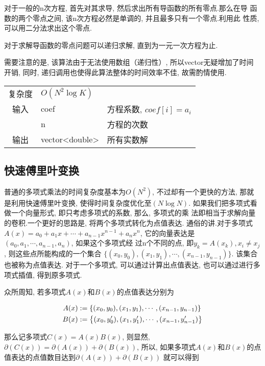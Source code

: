 对于一般的n次方程, 首先对其求导, 然后求出所有导函数的所有零点.那么在导
函数的两个零点之间, 该n次方程必然是单调的, 并且最多只有一个零点.利用此
性质, 可以用二分法求出这个零点.

对于求解导函数的零点问题可以递归求解, 直到为一元一次方程为止.

需要注意的是, 该算法由于无法使用数组（递归性）, 所以vector无疑增加了时间
开销, 同时, 递归调用也使得此算法整体的时间效率不佳, 故需酌情使用.

\begin{longtable}{|c|l|l|}
复杂度 & $O(N^{2}\log K)$ &  \\
输入 & coef & 方程系数, $coef[i] = a_{i}$ \\
 & n & 方程的次数 \\
输出 & vector<double> & 所有实数解 \\ 
\end{longtable}



    \subsection{快速傅里叶变换}\small
普通的多项式乘法的时间复杂度基本为$O(N^2)$, 不过却有一个更快的方法, 那就
是利用快速傅里叶变换, 使得时间复杂度优化至$(N\log N)$.
如果我们把多项式看做一个向量形式, 即只考虑多项式的系数, 那么, 多项式的乘
法即相当于求解向量的卷积.一个更好的思路是, 将两个多项式转化为点值表达.
通俗的讲.对于多项式
$A(x) = a_{0} + a_{1}x + \cdots + a_{n-1}x^{n-1} + a_{n}x^{n}$,
它的向量表达是$(a_{0},  a_{1}, \cdots , a_{n-1}, a_{n})$, 如果这个多项式经
过n个不同的点, 即$y_k = A(x_k), x_i \neq x_j$, 则这些点所能构成的一个集合
$\{(x_0, y_0), (x_1, y_1), \cdots , (x_{n - 1}, y_{n - 1})\}$.
该集合也被称为点值表达. 对于一个多项式, 可以通过计算出点值表达, 也可以通过进行多项式插值, 得到原多项式. 

众所周知, 若多项式$A(x)$和$B(x)$的点值表达分别为

\[ \begin{aligned}
A(x) &:= {\left\{ {(x_0, y_0), (x_1, y_1), \cdots , (x_{n - 1}, y_{n - 1})} \right\}} \\
B(x) &:= {\left\{ {(x_0, y'_0), (x_1, y'_1), \cdots , (x_{n - 1}, y'_{n - 1})} \right\}}
\end{aligned} \]

那么记多项式$C(x) = A(x)B(x)$, 则显然, $\partial (C(x)) = \partial (A(x)) + \partial (B(x))$, 所以, 如果多项式$A(x)$和$B(x)$的点值表达的点值数目达到$\partial (A(x)) + \partial (B(x))$
就可以得到

